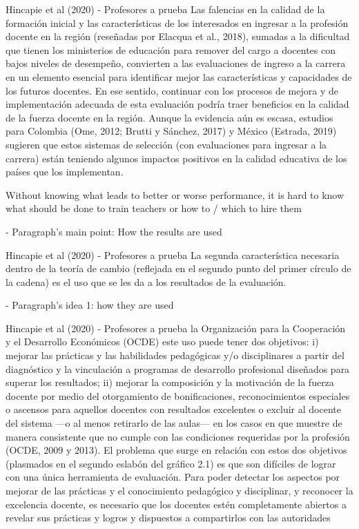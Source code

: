 Hincapie et al (2020) - Profesores a prueba
Las falencias en la calidad de la formación inicial y las características de los interesados
en ingresar a la profesión docente en la región (reseñadas por Elacqua et al., 2018), sumadas a la dificultad que tienen los ministerios de educación para remover del cargo a docentes con bajos niveles de desempeño, convierten a las evaluaciones de ingreso a la carrera en un elemento esencial para identificar mejor las características y capacidades de los futuros docentes. En ese sentido, continuar con los procesos de mejora y de implementación adecuada de esta evaluación podría traer beneficios en la calidad de la fuerza docente en la región. Aunque la evidencia aún es escasa, estudios para Colombia (Ome, 2012; Brutti y Sánchez, 2017) y México (Estrada, 2019) sugieren que estos sistemas de selección (con evaluaciones para ingresar a la carrera) están teniendo algunos impactos positivos en la calidad educativa de los países que los implementan.

Without knowing what leads to better or worse performance, it is hard to know what should be done to train teachers or how to / which to hire them \citep{Hanushek_et_al_2012}



- Paragraph's main point: How the results are used

Hincapie et al (2020) - Profesores a prueba
La segunda característica necesaria dentro de la teoría de cambio (reflejada en el segundo punto del primer círculo de la cadena) es el uso que se les da a los resultados de la evaluación.

- Paragraph's idea 1: how they are used

Hincapie et al (2020) - Profesores a prueba
la Organización para la Cooperación y el Desarrollo Económicos (OCDE) este uso puede tener dos objetivos: i) mejorar las prácticas y las habilidades pedagógicas y/o disciplinares a partir del diagnóstico y la vinculación a programas de desarrollo profesional diseñados para superar los resultados; ii) mejorar la composición y la motivación de la fuerza docente por medio del otorgamiento de bonificaciones, reconocimientos especiales o ascensos para aquellos docentes con resultados excelentes o excluir al docente del sistema —o al menos retirarlo de las aulas— en los casos en que muestre de manera consistente que no cumple con las condiciones requeridas por la profesión (OCDE, 2009 y 2013).
El problema que surge en relación con estos dos objetivos (plasmados en el segundo eslabón del gráfico 2.1) es que son difíciles de lograr con una única herramienta de evaluación.
Para poder detectar los aspectos por mejorar de las prácticas y el conocimiento pedagógico y disciplinar, y reconocer la excelencia docente, es necesario que los docentes estén completamente abiertos a revelar sus prácticas y logros y dispuestos a compartirlos con las autoridades

